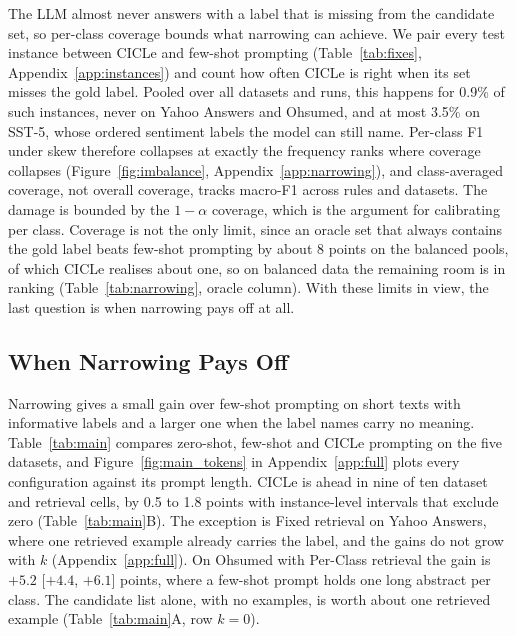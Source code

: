 The LLM almost never answers with a label that is missing from the candidate set, so per-class coverage bounds what narrowing can achieve.
We pair every test instance between CICLe and few-shot prompting (Table~\ref{tab:fixes}, Appendix~\ref{app:instances}) and count how often CICLe is right when its set misses the gold label.
Pooled over all datasets and runs, this happens for 0.9\% of such instances, never on Yahoo Answers and Ohsumed, and at most 3.5\% on SST-5, whose ordered sentiment labels the model can still name.
Per-class F1 under skew therefore collapses at exactly the frequency ranks where coverage collapses (Figure~\ref{fig:imbalance}, Appendix~\ref{app:narrowing}), and class-averaged coverage, not overall coverage, tracks macro-F1 across rules and datasets. %
The damage is bounded by the $1-\alpha$ coverage, which is the argument for calibrating per class.
Coverage is not the only limit, since an oracle set that always contains the gold label beats few-shot prompting by about 8 points on the balanced pools, of which CICLe realises about one, so on balanced data the remaining room is in ranking (Table~\ref{tab:narrowing}, oracle column).
With these limits in view, the last question is when narrowing pays off at all.



\subsection{When Narrowing Pays Off}
\label{sec:res-gain}

Narrowing gives a small gain over few-shot prompting on short texts with informative labels and a larger one when the label names carry no meaning.
Table~\ref{tab:main} compares zero-shot, few-shot and CICLe prompting on the five datasets, and Figure~\ref{fig:main_tokens} in Appendix~\ref{app:full} plots every configuration against its prompt length. %
CICLe is ahead in nine of ten dataset and retrieval cells, by 0.5 to 1.8 points with instance-level intervals that exclude zero (Table~\ref{tab:main}B). %
The exception is Fixed retrieval on Yahoo Answers, where one retrieved example already carries the label, and the gains do not grow with $k$ (Appendix~\ref{app:full}).
On Ohsumed with Per-Class retrieval the gain is $+5.2$ [$+4.4$, $+6.1$] points, where a few-shot prompt holds one long abstract per class. %
The candidate list alone, with no examples, is worth about one retrieved example (Table~\ref{tab:main}A, row $k = 0$).


